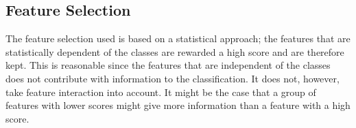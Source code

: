 \subsection{Feature Selection}
The feature selection used is based on a statistical approach; the features that are statistically dependent of the classes are rewarded a high score and are therefore kept. This is reasonable since the features that are independent of the classes does not contribute with information to the classification. It does not, however, take feature interaction into account. It might be the case that a group of features with lower scores might give more information than a feature with a high score. 